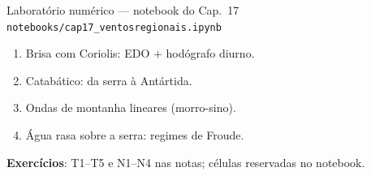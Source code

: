 \documentclass[aspectratio=169,11pt]{beamer}
\begin{document}
\begin{frame}{Laboratório numérico --- notebook do Cap.~17}
  \texttt{notebooks/cap17\_ventosregionais.ipynb}
  \begin{enumerate}
    \item Brisa com Coriolis: EDO $+$ hodógrafo diurno.
    \item Catabático: da serra à Antártida.
    \item Ondas de montanha lineares (morro-sino).
    \item Água rasa sobre a serra: regimes de Froude.
  \end{enumerate}
  \vspace{0.4em}
  \textbf{Exercícios}: T1--T5 e N1--N4 nas notas; células reservadas no
  notebook.
  \vfill
  \atribuicao
\end{frame}
\end{document}
